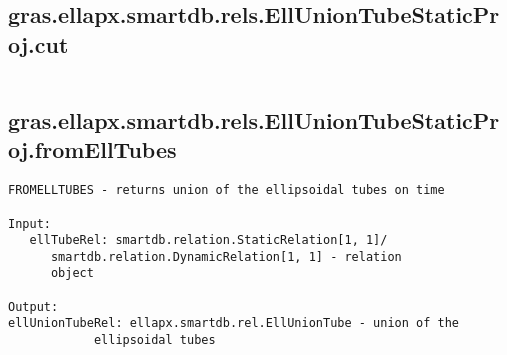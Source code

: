 \subsection{\texorpdfstring{gras.ellapx.smartdb.rels.EllUnionTubeStaticProj.cut}{cut}}\label{method:gras.ellapx.smartdb.rels.EllUnionTubeStaticProj.cut}
\begin{verbatim}

\end{verbatim}
\subsection{\texorpdfstring{gras.ellapx.smartdb.rels.EllUnionTubeStaticProj.fromEllTubes}{fromEllTubes}}\label{method:gras.ellapx.smartdb.rels.EllUnionTubeStaticProj.fromEllTubes}
\begin{verbatim}
FROMELLTUBES - returns union of the ellipsoidal tubes on time

Input:
   ellTubeRel: smartdb.relation.StaticRelation[1, 1]/
      smartdb.relation.DynamicRelation[1, 1] - relation
      object

Output:
ellUnionTubeRel: ellapx.smartdb.rel.EllUnionTube - union of the
            ellipsoidal tubes
\end{verbatim}
